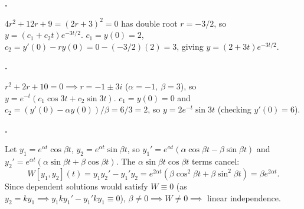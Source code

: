 \documentclass[10pt]{scrartcl}
\begin{document}
\begin{prob}
  \textbf{.}\par{}
  \begin{steps}
    \ii $4r^2+12r+9=(2r+3)^2=0$ has double root $r=-3/2$, so $y=(c_1+c_2t)e^{-3t/2}$.
    \ii $c_1=y(0)=2$, $c_2=y'(0)-ry(0)=0-(-3/2)(2)=3$, giving $y=(2+3t)e^{-3t/2}$.
  \end{steps}
\end{prob}

\begin{prob}
  \textbf{.}\par{}
  \begin{steps}
    \ii $r^2+2r+10=0\implies r=-1\pm 3i$ ($\alpha=-1,\ \beta=3$), so $y=e^{-t}(c_1\cos 3t+c_2\sin 3t)$.
    \ii $c_1=y(0)=0$ and $c_2=(y'(0)-\alpha y(0))/\beta=6/3=2$, so $y=2e^{-t}\sin 3t$ (checking $y'(0)=6$).
  \end{steps}
\end{prob}

\begin{prob}
  \textbf{.}\par{}
  \begin{steps}
    \ii Let $y_1=e^{\alpha t}\cos\beta t$, $y_2=e^{\alpha t}\sin\beta t$, so $y_1'=e^{\alpha t}(\alpha\cos\beta t-\beta\sin\beta t)$ and $y_2'=e^{\alpha t}(\alpha\sin\beta t+\beta\cos\beta t)$.
    \ii The $\alpha\sin\beta t\cos\beta t$ terms cancel:
    \[
      W[y_1,y_2](t)=y_1y_2'-y_1'y_2=e^{2\alpha t}(\beta\cos^2\beta t+\beta\sin^2\beta t)=\beta e^{2\alpha t}.
    \]
    \ii Since dependent solutions would satisfy $W\equiv 0$ (as $y_2=ky_1\implies y_1ky_1'-y_1'ky_1\equiv 0$), $\beta\neq 0\implies W\neq 0\implies$ linear independence.
  \end{steps}
\end{prob}
\end{document}
